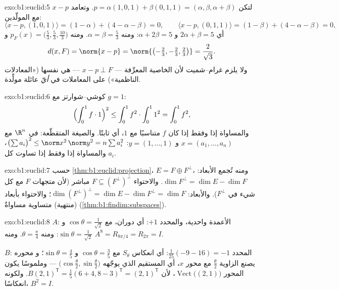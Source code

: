 \begin{solution}{exo:b1:euclid:5}
لتكن $p = \alpha(1,0,1) + \beta(0,1,1) = (\alpha, \beta, \alpha +
\beta)$. وتعامد $x - p$ مع المولّدين:
\[
\langle x - p, (1,0,1)\rangle = (1 - \alpha) + (4 - \alpha - \beta)
= 0,
\qquad
\langle x - p, (0,1,1)\rangle = (1 - \beta) + (4 - \alpha - \beta)
= 0,
\]
أي $2\alpha + \beta = 5$ و $\alpha + 2\beta = 5$: ومنه $\alpha =
\beta = \frac53$. ومنه $p_F(x) = \bigl(\frac53, \frac53,
\frac{10}{3}\bigr)$ و
\[
d(x, F) = \norm{x - p} =
\norm{\bigl(-\tfrac23, -\tfrac23, \tfrac23\bigr)} =
\frac{2}{\sqrt 3} .
\]
ولا يلزم غرام--شميت لأن الخاصية المعرِّفة
 --- $x - p \perp F$ --- هي نفسها 
(«المعادلات الناظمية») على المعاملات في \emph{أيّ} عائلة
مولِّدة.
\end{solution}

\begin{solution}{exo:b1:euclid:6}
كوشي--شوارتز مع $g = 1$:
\[
\Bigl(\int_0^1 f \cdot 1\Bigr)^2 \leq \int_0^1 f^2 \cdot \int_0^1
1^2 = \int_0^1 f^2 ,
\]
والمساواة إذا وفقط إذا كان $f$ متناسبًا مع $1$، أي ثابتًا. والصيغة
المتقطّعة: في $\R^n$ مع $x = (a_1, \dots, a_n)$ و $y = (1, \dots,
1)$:
$\bigl(\sum a_i\bigr)^2 \leq \norm x^2\, \norm y^2 = n \sum a_i^2$،
والمساواة إذا وفقط إذا تساوت كل $a_i$.
\end{solution}

\begin{solution}{exo:b1:euclid:7}
حسب \cref{thm:b1:euclid:projection}، $E = F \oplus F^\perp$، ومنه
تُجمع الأبعاد: $\dim F^\perp = \dim E - \dim F$. والاحتواء $F
\subseteq (F^\perp)^\perp$ مباشر (لأن متجهات $F$
 مع كل شيء في $F^\perp$). والأبعاد:
$\dim(F^\perp)^\perp = \dim E - \dim F^\perp = \dim F$؛ والاحتواء
بأبعاد (منتهية) متساوية مساواةٌ
(\cref{thm:b1:findim:subspaces}).
\end{solution}

\begin{solution}{exo:b1:euclid:8}
$A$: الأعمدة واحدية، والمحدد $+1$: أي دوران، مع $\cos\theta =
\frac{1}{\sqrt2}$ و $\sin\theta = \frac{1}{\sqrt2}$: ومنه $\theta =
\frac\pi4$. ومنه $A^8 = R_{8\pi/4} = R_{2\pi} = I$.

$B$: المحدد $\frac{1}{25}(-9 - 16) = -1$: أي انعكاس
$S_\theta$ مع $\cos\theta = \frac35$ و $\sin\theta = \frac45$؛ و
محوره يصنع الزاوية $\frac\theta2$ مع محور $x$، أي
المستقيم الذي يوجّهه $\bigl(\cos\frac\theta2, \sin\frac\theta2\bigr)$
--- وملموسًا يكون المحور
$\operatorname{Vect}\bigl((2, 1)\bigr)$، لأن $B(2,1)^{\mathsf T} =
\frac15(6+4, 8-3)^{\mathsf T} = (2,1)^{\mathsf T}$. ولكونه انعكاسًا،
$B^2 = I$.
\end{solution}

